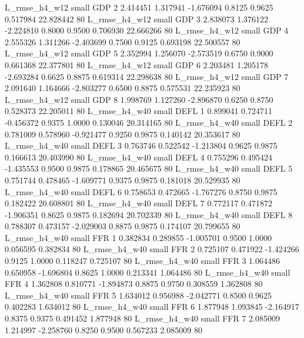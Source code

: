  L_rmse_h4_w12      small      GDP                 2 2.414451 1.317941 -1.676094 0.8125 0.9625  0.517984   22.828442 80
 L_rmse_h4_w12      small      GDP                 3 2.838073 1.376122 -2.224810 0.8000 0.9500  0.706930   22.666266 80
 L_rmse_h4_w12      small      GDP                 4 2.555326 1.311266 -2.403699 0.7500 0.9125  0.693198   22.500557 80
 L_rmse_h4_w12      small      GDP                 5 2.352994 1.256070 -2.573519 0.6750 0.9000  0.661368   22.377801 80
 L_rmse_h4_w12      small      GDP                 6 2.203481 1.205178 -2.693284 0.6625 0.8875  0.619314   22.298638 80
 L_rmse_h4_w12      small      GDP                 7 2.091640 1.164666 -2.803277 0.6500 0.8875  0.575531   22.235923 80
 L_rmse_h4_w12      small      GDP                 8 1.998769 1.127260 -2.896870 0.6250 0.8750  0.528373   22.205011 80
 L_rmse_h4_w40      small     DEFL                 1 0.899041 0.724711 -0.456372 0.9375 1.0000  0.130046   20.314165 80
 L_rmse_h4_w40      small     DEFL                 2 0.781009 0.578960 -0.921477 0.9250 0.9875  0.140142   20.353617 80
 L_rmse_h4_w40      small     DEFL                 3 0.763746 0.522542 -1.213804 0.9625 0.9875  0.166613   20.403990 80
 L_rmse_h4_w40      small     DEFL                 4 0.755296 0.495424 -1.435553 0.9500 0.9875  0.178865   20.465675 80
 L_rmse_h4_w40      small     DEFL                 5 0.751744 0.478465 -1.609771 0.9375 0.9875  0.181018   20.529935 80
 L_rmse_h4_w40      small     DEFL                 6 0.758653 0.472665 -1.767276 0.8750 0.9875  0.182422   20.608801 80
 L_rmse_h4_w40      small     DEFL                 7 0.772117 0.471872 -1.906351 0.8625 0.9875  0.182694   20.702339 80
 L_rmse_h4_w40      small     DEFL                 8 0.788307 0.473157 -2.029003 0.8875 0.9875  0.174107   20.799655 80
 L_rmse_h4_w40      small      FFR                 1 0.382834 0.289855 -1.005701 0.9500 1.0000  0.056595    0.382834 80
 L_rmse_h4_w40      small      FFR                 2 0.725107 0.471922 -1.424266 0.9125 1.0000  0.118247    0.725107 80
 L_rmse_h4_w40      small      FFR                 3 1.064486 0.650958 -1.696804 0.8625 1.0000  0.213341    1.064486 80
 L_rmse_h4_w40      small      FFR                 4 1.362808 0.810771 -1.894873 0.8875 0.9750  0.308559    1.362808 80
 L_rmse_h4_w40      small      FFR                 5 1.634012 0.956988 -2.042771 0.8500 0.9625  0.402283    1.634012 80
 L_rmse_h4_w40      small      FFR                 6 1.877948 1.093845 -2.164917 0.8375 0.9375  0.491452    1.877948 80
 L_rmse_h4_w40      small      FFR                 7 2.085009 1.214997 -2.258760 0.8250 0.9500  0.567233    2.085009 80

